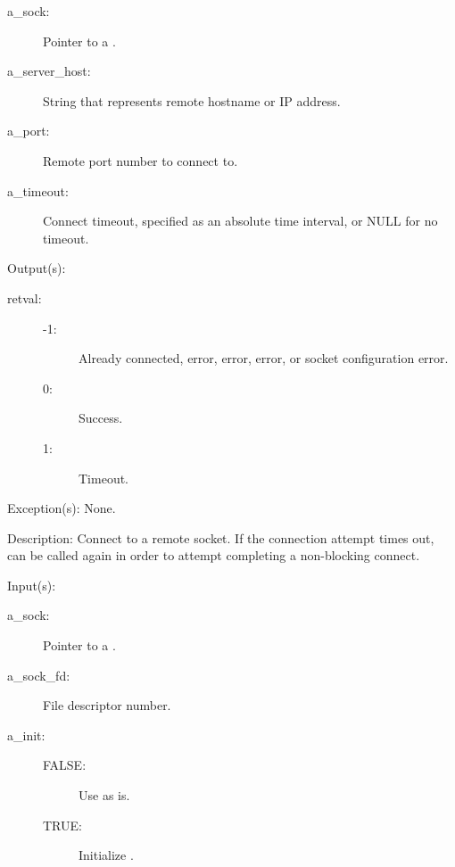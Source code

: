 \begin{capi}
\begin{capilist}
\begin{description}
		\item[a\_sock: ]
			Pointer to a .
		\item[a\_server\_host: ]
			String that represents remote hostname or IP address.
		\item[a\_port: ]
			Remote port number to connect to.
		\item[a\_timeout: ]
			Connect timeout, specified as an absolute time interval,
			or NULL for no timeout.
		\end{description}
	\item[Output(s): ]
		\begin{description}\item[]
		\item[retval: ]
			\begin{description}\item[]
			\item[-1: ]
				Already connected,  error,
				 error,  error,
				or socket configuration error.
			\item[0: ]
				Success.
			\item[1: ]
				Timeout.
			\end{description}
		\end{description}
	\item[Exception(s): ] None.
	\item[Description: ]
		Connect to a remote socket.  If the connection attempt times
		out,  can be called again in order to
		attempt completing a non-blocking connect.
	\end{capilist}
\label{sock_wrap}
	\begin{capilist}
	\item[Input(s): ]
		\begin{description}\item[]
		\item[a\_sock: ]
			Pointer to a .
		\item[a\_sock\_fd: ]
			File descriptor number.
		\item[a\_init: ]
			\begin{description}\item[]
			\item[FALSE: ] Use  as is.
			\item[TRUE: ] Initialize .
			\end{description}

\end{description}
\end{capilist}
\end{capi}
